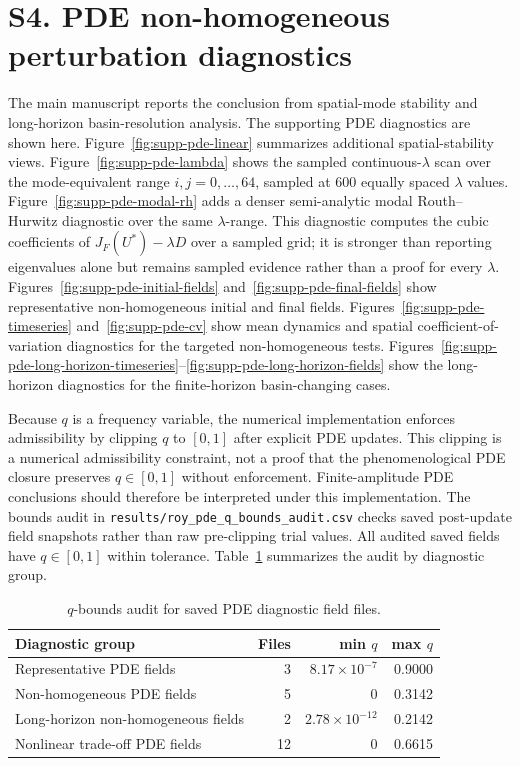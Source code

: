 \documentclass[11pt]{article}
\begin{document}
\section*{S4. PDE non-homogeneous perturbation diagnostics}

The main manuscript reports the conclusion from spatial-mode stability and long-horizon basin-resolution analysis. The supporting PDE diagnostics are shown here. Figure~\ref{fig:supp-pde-linear} summarizes additional spatial-stability views. Figure~\ref{fig:supp-pde-lambda} shows the sampled continuous-\(\lambda\) scan over the mode-equivalent range \(i,j=0,\ldots,64\), sampled at 600 equally spaced \(\lambda\) values. Figure~\ref{fig:supp-pde-modal-rh} adds a denser semi-analytic modal Routh--Hurwitz diagnostic over the same \(\lambda\)-range. This diagnostic computes the cubic coefficients of \(J_F(U^*)-\lambda D\) over a sampled grid; it is stronger than reporting eigenvalues alone but remains sampled evidence rather than a proof for every \(\lambda\). Figures~\ref{fig:supp-pde-initial-fields} and~\ref{fig:supp-pde-final-fields} show representative non-homogeneous initial and final fields. Figures~\ref{fig:supp-pde-timeseries} and~\ref{fig:supp-pde-cv} show mean dynamics and spatial coefficient-of-variation diagnostics for the targeted non-homogeneous tests. Figures~\ref{fig:supp-pde-long-horizon-timeseries}--\ref{fig:supp-pde-long-horizon-fields} show the long-horizon diagnostics for the finite-horizon basin-changing cases.

Because \(q\) is a frequency variable, the numerical implementation enforces admissibility by clipping \(q\) to \([0,1]\) after explicit PDE updates. This clipping is a numerical admissibility constraint, not a proof that the phenomenological PDE closure preserves \(q\in[0,1]\) without enforcement. Finite-amplitude PDE conclusions should therefore be interpreted under this implementation. The bounds audit in \texttt{results/roy\_pde\_q\_bounds\_audit.csv} checks saved post-update field snapshots rather than raw pre-clipping trial values. All audited saved fields have \(q\in[0,1]\) within tolerance. Table~\ref{tab:q-bounds-audit} summarizes the audit by diagnostic group.

\begin{table}[htbp]
  \centering
  \caption{\(q\)-bounds audit for saved PDE diagnostic field files.}
  \label{tab:q-bounds-audit}
  \small
  \begin{tabular}{lrrr}
    \toprule
    Diagnostic group & Files & min \(q\) & max \(q\) \\
    \midrule
    Representative PDE fields & 3 & \(8.17\times10^{-7}\) & 0.9000 \\
    Non-homogeneous PDE fields & 5 & 0 & 0.3142 \\
    Long-horizon non-homogeneous fields & 2 & \(2.78\times10^{-12}\) & 0.2142 \\
    Nonlinear trade-off PDE fields & 12 & 0 & 0.6615 \\
    \bottomrule
  \end{tabular}
\end{table}
\end{document}
